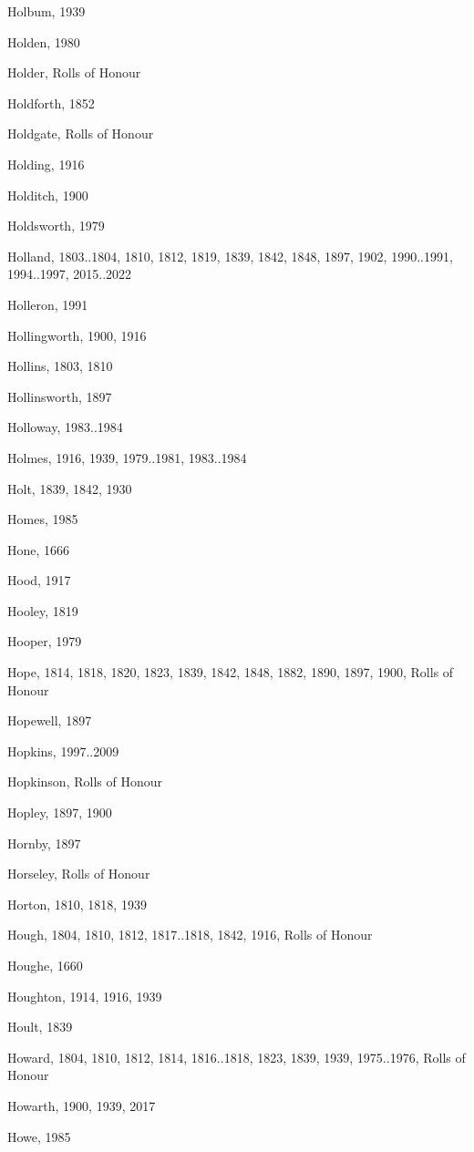 \begin{theindex}
\item Holbum, 1939
\item Holden, 1980
\item Holder, Rolls of Honour
\item Holdforth, 1852
\item Holdgate, Rolls of Honour
\item Holding, 1916
\item Holditch, 1900
\item Holdsworth, 1979
\item Holland, 1803..1804, 1810, 1812, 1819, 1839, 1842, 1848, 1897, 1902, 1990..1991, 1994..1997, 2015..2022
\item Holleron, 1991
\item Hollingworth, 1900, 1916
\item Hollins, 1803, 1810
\item Hollinsworth, 1897
\item Holloway, 1983..1984
\item Holmes, 1916, 1939, 1979..1981, 1983..1984
\item Holt, 1839, 1842, 1930
\item Homes, 1985
\item Hone, 1666
\item Hood, 1917
\item Hooley, 1819
\item Hooper, 1979
\item Hope, 1814, 1818, 1820, 1823, 1839, 1842, 1848, 1882, 1890, 1897, 1900, Rolls of Honour
\item Hopewell, 1897
\item Hopkins, 1997..2009
\item Hopkinson, Rolls of Honour
\item Hopley, 1897, 1900
\item Hornby, 1897
\item Horseley, Rolls of Honour
\item Horton, 1810, 1818, 1939
\item Hough, 1804, 1810, 1812, 1817..1818, 1842, 1916, Rolls of Honour
\item Houghe, 1660
\item Houghton, 1914, 1916, 1939
\item Hoult, 1839
\item Howard, 1804, 1810, 1812, 1814, 1816..1818, 1823, 1839, 1939, 1975..1976, Rolls of Honour
\item Howarth, 1900, 1939, 2017
\item Howe, 1985

\end{theindex}
